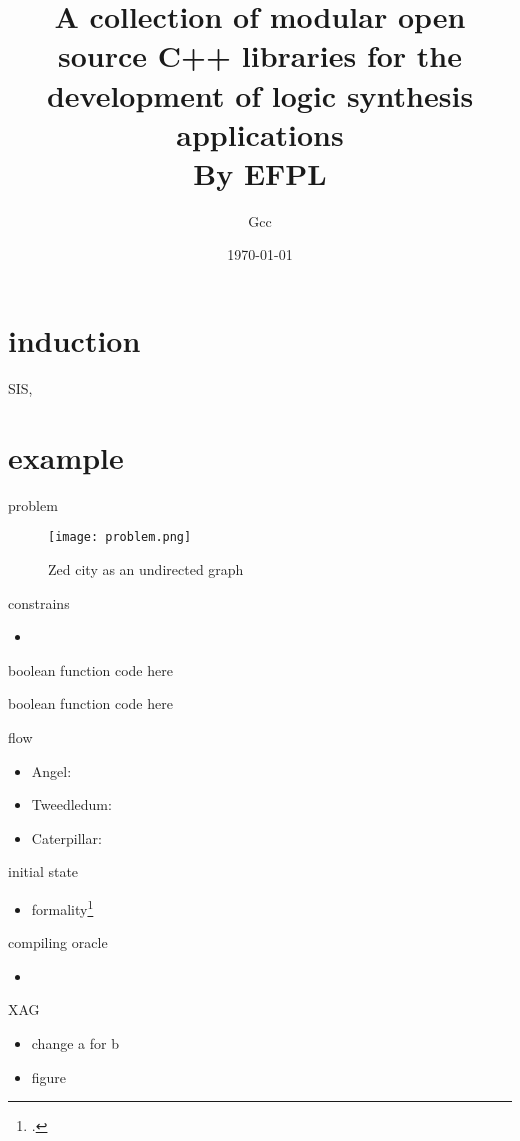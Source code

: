 \documentclass[aspectratio=1610]{beamer}
\title{A collection of modular open source C++ libraries for the development of logic synthesis applications\\ By EFPL}
\author{Gcc}
\date\today
\begin{document}
\begin{frame}[plain]
  \titlepage
\end{frame}
\section{induction}
\begin{frame}
  SIS, 
\end{frame}

\section{example}
\begin{frame}{problem}
  \begin{figure}[ht]
    \centering
    \texttt{[image: problem.png]}
    \caption{Zed city as an undirected graph} 
    \label{dataset}
  \end{figure}
\end{frame}
\begin{frame}{constrains}
  \begin{itemize}
    \item 
  \end{itemize}
\end{frame}
\begin{frame}{boolean function}
  code here
\end{frame}
\begin{frame}{boolean function}
  code here
\end{frame}
\begin{frame}{flow}
  \begin{itemize}
    \item Angel:
    \item Tweedledum:
    \item Caterpillar:
  \end{itemize}
\end{frame}
\begin{frame}{initial state}
  \begin{itemize}
    \item formality\footcite{}
  \end{itemize}
\end{frame}
\begin{frame}{compiling oracle}
  \begin{itemize}
    \item 
  \end{itemize}
\end{frame}
\begin{frame}{XAG}
  \begin{itemize}
    \item change a for b
    \item figure
  \end{itemize}
\end{frame}
\end{document}

